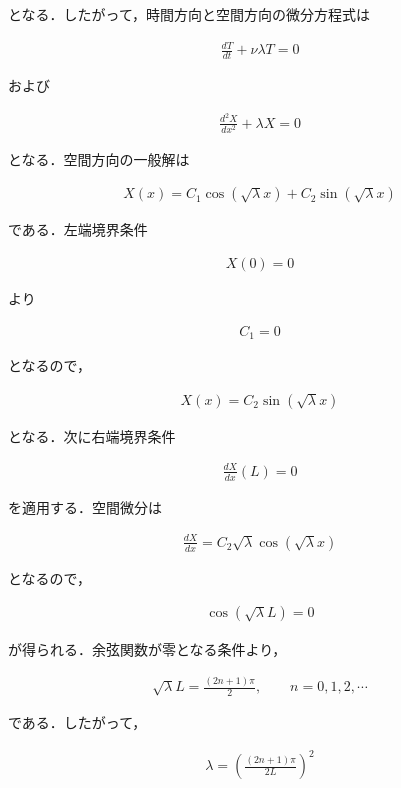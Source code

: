 \documentclass[dvipdfmx]{jsarticle}
\begin{document}
となる．したがって，時間方向と空間方向の微分方程式は

\begin{align}
\frac{dT}{dt}
+\nu\lambda T
=
0
\end{align}

および

\begin{align}
\frac{d^2X}{dx^2}
+\lambda X
=
0
\end{align}

となる．空間方向の一般解は

\begin{align}
X(x)
=
C_1\cos(\sqrt{\lambda}x)
+
C_2\sin(\sqrt{\lambda}x)
\end{align}

である．左端境界条件

\begin{align}
X(0)=0
\end{align}

より

\begin{align}
C_1=0
\end{align}

となるので，

\begin{align}
X(x)
=
C_2
\sin(\sqrt{\lambda}x)
\end{align}

となる．次に右端境界条件

\begin{align}
\frac{dX}{dx}(L)=0
\end{align}

を適用する．空間微分は

\begin{align}
\frac{dX}{dx}
=
C_2\sqrt{\lambda}
\cos(\sqrt{\lambda}x)
\end{align}

となるので，

\begin{align}
\cos(\sqrt{\lambda}L)=0
\end{align}

が得られる．余弦関数が零となる条件より，

\begin{align}
\sqrt{\lambda}L
=
\frac{(2n+1)\pi}{2},
\qquad
n=0,1,2,\cdots
\end{align}

である．したがって，

\begin{align}
\lambda
=
\left(
\frac{(2n+1)\pi}{2L}
\right)^2
\end{align}
\end{document}
